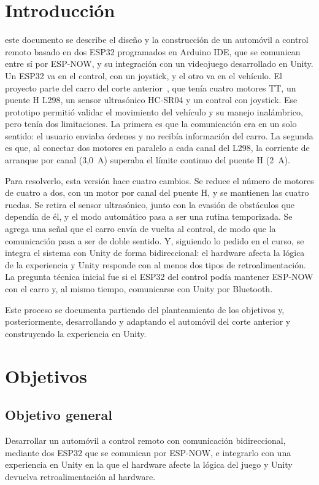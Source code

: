 \documentclass[journal]{IEEEtran}
\begin{document}
\section{Introducción}
 este documento se describe el diseño y la construcción de un automóvil a control remoto basado en dos ESP32 programados en Arduino IDE, que se comunican entre sí por ESP-NOW, y su integración con un videojuego desarrollado en Unity. Un ESP32 va en el control, con un joystick, y el otro va en el vehículo. El proyecto parte del carro del corte anterior~\cite{corte2}, que tenía cuatro motores TT, un puente H L298, un sensor ultrasónico HC-SR04 y un control con joystick. Ese prototipo permitió validar el movimiento del vehículo y su manejo inalámbrico, pero tenía dos limitaciones. La primera es que la comunicación era en un solo sentido: el usuario enviaba órdenes y no recibía información del carro. La segunda es que, al conectar dos motores en paralelo a cada canal del L298, la corriente de arranque por canal (3,0~A) superaba el límite continuo del puente H (2~A).

Para resolverlo, esta versión hace cuatro cambios. Se reduce el número de motores de cuatro a dos, con un motor por canal del puente H, y se mantienen las cuatro ruedas. Se retira el sensor ultrasónico, junto con la evasión de obstáculos que dependía de él, y el modo automático pasa a ser una rutina temporizada. Se agrega una señal que el carro envía de vuelta al control, de modo que la comunicación pasa a ser de doble sentido. Y, siguiendo lo pedido en el curso, se integra el sistema con Unity de forma bidireccional: el hardware afecta la lógica de la experiencia y Unity responde con al menos dos tipos de retroalimentación. La pregunta técnica inicial fue si el ESP32 del control podía mantener ESP-NOW con el carro y, al mismo tiempo, comunicarse con Unity por Bluetooth.

Este proceso se documenta partiendo del planteamiento de los objetivos y, posteriormente, desarrollando y adaptando el automóvil del corte anterior y construyendo la experiencia en Unity.

\section{Objetivos}
\subsection{Objetivo general}
Desarrollar un automóvil a control remoto con comunicación bidireccional, mediante dos ESP32 que se comunican por ESP-NOW, e integrarlo con una experiencia en Unity en la que el hardware afecte la lógica del juego y Unity devuelva retroalimentación al hardware.
\end{document}
